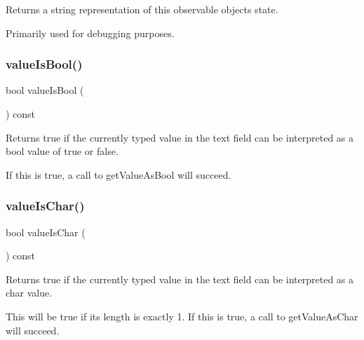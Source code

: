 Returns a string representation of this observable object\textquotesingle{}s state. 

Primarily used for debugging purposes. \mbox{\label{classGTextField_a203f90275053ab957b1ea5a40dc3dd1e}} 
\subsubsection{\texorpdfstring{value\+Is\+Bool()}{valueIsBool()}}
{\footnotesize\ttfamily bool value\+Is\+Bool (\begin{DoxyParamCaption}{ }\end{DoxyParamCaption}) const\hspace{0.3cm}{\ttfamily [virtual]}}



Returns true if the currently typed value in the text field can be interpreted as a bool value of true or false. 

If this is true, a call to get\+Value\+As\+Bool will succeed. \mbox{\label{classGTextField_ac7a337b1e4c2f752a7f3fb634c92b442}} 
\subsubsection{\texorpdfstring{value\+Is\+Char()}{valueIsChar()}}
{\footnotesize\ttfamily bool value\+Is\+Char (\begin{DoxyParamCaption}{ }\end{DoxyParamCaption}) const\hspace{0.3cm}{\ttfamily [virtual]}}



Returns true if the currently typed value in the text field can be interpreted as a char value. 

This will be true if its length is exactly 1. If this is true, a call to get\+Value\+As\+Char will succeed. \mbox{\label{classGTextField_aa80caadc7498333f74a08b4cdc0528c1}} 
